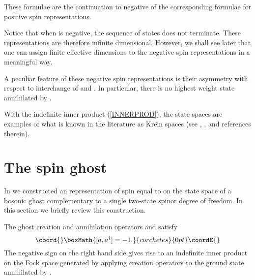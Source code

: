 \documentclass[a4paper,dvips,12pt]{article}
\providecommand {\half} {{1 \over 2}}
\providecommand {\ket}[1] {\left| #1 \right>}
\begin{document}
    These formulae are the continuation to negative \coordHE{} of the
    corresponding formulae for positive spin representations.

    Notice that when \coordHE{} is negative, the
    sequence of states \coordHE{} does not terminate.  These
    representations are therefore infinite dimensional.  However,
    we shall see later that one can assign finite effective
    dimensions
    to the negative spin representations in a meaningful way.

    A peculiar feature of these negative spin representations is their asymmetry with
    respect to interchange of \coordHE{} and \coordHE{}.  In particular,
    there is no highest weight state annihilated by
    \coordHE{}.

    With the indefinite inner product
    (\ref{INNERPROD}), the state spaces are examples of
    what is known in the literature as Kre\u{\i}n spaces (see
    \cite{BOGNAR}, \cite{MALCEV}, \cite{JACOBZYK} and references therein).

    \section{The spin \myHighlight{$-\half$}\coordHE{} ghost}

    In \cite{MYSELF} we constructed an \coordHE{} representation of
    spin equal to \myHighlight{$-\half$}\coordHE{} on the state space of a bosonic ghost
    complementary to a single two-state spinor degree of freedom.
    In this section we briefly review this construction.

    The ghost creation and annihilation
    operators \coordHE{} and \coordHE{} satisfy
    \[\coord{}\boxMath{
        [a, a^\dagger] = -1.
    }{corchetes}{0pt}\coordE{}\]
    The negative sign on the right hand side gives rise to an
    indefinite inner product on
    the Fock space generated by applying creation operators
    to the ground state \myHighlight{$\ket{\half}_g$}\coordHE{}
    annihilated by \coordHE{}.
\end{document}
